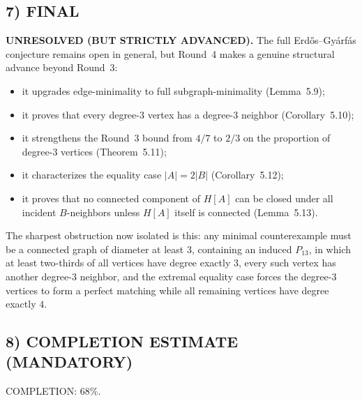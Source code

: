 \subsection*{7) FINAL}
\textbf{UNRESOLVED (BUT STRICTLY ADVANCED).} The full Erd\H{o}s--Gy\'arf\'as conjecture remains open in general, but Round~4 makes a genuine structural advance beyond Round~3:
\begin{itemize}
  \item it upgrades edge-minimality to full subgraph-minimality (Lemma~5.9);
  \item it proves that every degree-$3$ vertex has a degree-$3$ neighbor (Corollary~5.10);
  \item it strengthens the Round~3 bound from $4/7$ to $2/3$ on the proportion of degree-$3$ vertices (Theorem~5.11);
  \item it characterizes the equality case $|A|=2|B|$ (Corollary~5.12);
  \item it proves that no connected component of $H[A]$ can be closed under all incident $B$-neighbors unless $H[A]$ itself is connected (Lemma~5.13).
\end{itemize}
The sharpest obstruction now isolated is this: any minimal counterexample must be a connected graph of diameter at least $3$, containing an induced $P_{13}$, in which at least two-thirds of all vertices have degree exactly $3$, every such vertex has another degree-$3$ neighbor, and the extremal equality case forces the degree-$3$ vertices to form a perfect matching while all remaining vertices have degree exactly $4$.

\subsection*{8) COMPLETION ESTIMATE (MANDATORY)}
COMPLETION: 68\%.

